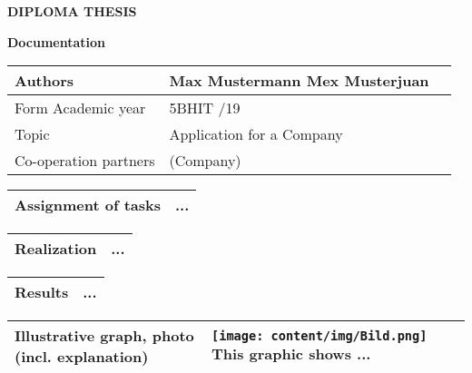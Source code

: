 \begin{center}
\textbf{\LARGE DIPLOMA THESIS}

\textbf{Documentation}
\end{center}

\begin{tabular}{|p{53mm}|p{110mm}|@{}m{0cm}@{}}
\hline
Authors & Max Mustermann \newline Mex Musterjuan & \\ [0.5cm]
\hline
Form \newline Academic year & 5BHIT \newline 2018/19 & \\
\hline
Topic & Application for a Company & \\ [1cm]
\hline
Co-operation partners & (Company) & \\ [0.5cm]
\hline
\end{tabular}

\vspace{0.5cm}

\begin{tabular}{|p{53mm}|p{110mm}|}
\hline
\vspace{2cm} Assignment of tasks &  \vspace{2cm} ... \\ [2cm]
\hline
\end{tabular}

\vspace{0.5cm}

\begin{tabular}{|p{53mm}|p{110mm}|}
\hline
\vspace{1.5cm} Realization & \vspace{1.5cm} ... \\ [1.5cm]
\hline
\end{tabular}

\vspace{0.5cm}

\begin{tabular}{|p{53mm}|p{110mm}|}
\hline
\vspace{2cm} Results & \vspace{2cm} ... \\ [2cm]
\hline
\end{tabular}
\newpage

\begin{tabular}{|p{53mm}|p{110mm}|}
\hline
\vspace{5.5cm}
Illustrative graph, photo (incl. explanation) & \vspace{0.1cm}
\texttt{[image: content/img/Bild.png]}
This graphic shows ...
\\ [2.5cm]
\hline
\end{tabular}

